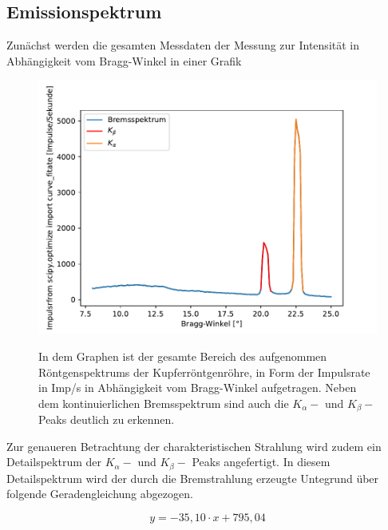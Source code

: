 \documentclass[titlepage = firstcover]{scrartcl}
\begin{document}
        \subsection{Emissionspektrum}
            Zunächst werden die gesamten Messdaten der Messung zur Intensität in Abhängigkeit vom Bragg-Winkel in einer Grafik
            \FloatBarrier
            \begin{figure}[h]
              \centering
              \caption{In dem Graphen ist der gesamte Bereich des aufgenommen Röntgenspektrums der Kupferröntgenröhre, in Form der Impulsrate in Imp/s in Abhängigkeit vom Bragg-Winkel aufgetragen. Neben dem kontinuierlichen Bremsspektrum sind auch die $K_{\alpha}-$ und $K_{\beta}-$ Peaks deutlich zu erkennen.}
              \includegraphics{Spektrum_Cu.pdf}
              \label{fig:spektrum}
            \end{figure}
            \FloatBarrier
            \noindent
            Zur genaueren Betrachtung der charakteristischen Strahlung wird zudem ein Detailspektrum der $K_{\alpha}-$ und $K_{\beta}-$ Peaks angefertigt. In diesem Detailspektrum wird der durch die 
            Bremstrahlung erzeugte Untegrund über folgende Geradengleichung abgezogen.

            \begin{equation*}
              y = -35,10 \cdot x + 795,04
            \end{equation*}
\end{document}
